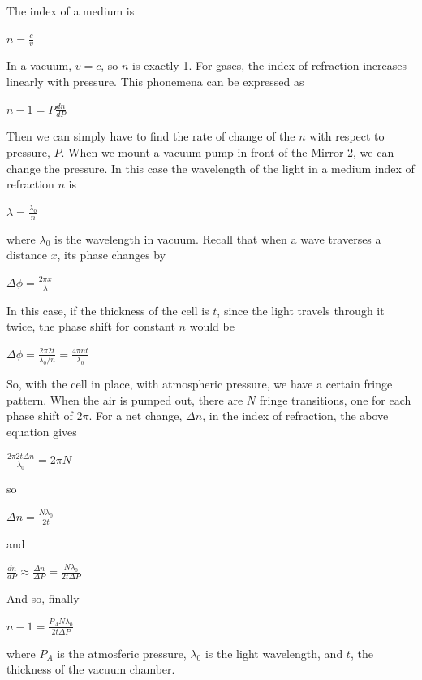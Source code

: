 \documentclass[a4paper,12pt]{report}
\begin{document}
The index of a medium is 
\begin{center}
	$n=\frac{c}{v}$
\end{center}
In a vacuum, $v=c$, so $n$ is exactly 1. For gases, the index of refraction increases linearly with pressure. This phonemena can be expressed as
\begin{center}
	$n-1=P\frac{dn}{dP}$
\end{center}
Then we can simply have to find the rate of change of the $n$ with respect to pressure, $P$. When we mount a vacuum pump in front of the Mirror 2, we can change the pressure. In this case the wavelength of the light in a medium index of refraction $n$ is
\begin{center}
	$\lambda=\frac{\lambda_{0}}{n}$
\end{center}
where $\lambda_{0}$ is the wavelength in vacuum. Recall that when a wave traverses a distance $x$,
its phase changes by
\begin{center}
	$\Delta\phi=\frac{2\pi x}{\lambda}$
\end{center}
In this case, if the thickness of the cell is $t$, since the light travels through it twice, the
phase shift for constant $n$ would be
\begin{center}
	$\Delta\phi=\frac{2\pi2t}{\lambda_{0}/n}=\frac{4\pi nt}{\lambda_{0}}$
\end{center}
So, with the cell in place, with atmospheric pressure, we have a certain fringe pattern.
When the air is pumped out, there are $N$ fringe transitions, one for each phase shift of $2\pi$. For a net change, $\Delta n$, in the index of refraction, the above equation gives
\begin{center}
	$\frac{2\pi2t\Delta n}{\lambda_{0}}=2\pi N$
\end{center}
so
\begin{center}
	$\Delta n =\frac{N\lambda_{0}}{2t}$
\end{center}
and
\begin{center}
	$\frac{dn}{dP}\approx\frac{\Delta n}{\Delta P}=\frac{N\lambda_{0}}{2t\Delta P}$
\end{center}
And so, finally
\begin{center}
	$n-1=\frac{P_{A}N\lambda_{0}}{2t\Delta P}$
\end{center}
where $P_{A}$ is the atmosferic pressure, $\lambda_{0}$ is the light wavelength, and $t$, the thickness of the vacuum chamber.
\end{document}
